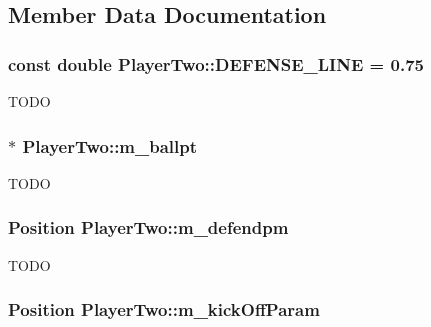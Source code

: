 \subsection{Member Data Documentation}
\hypertarget{classPlayerTwo_a86e1752bf84fab5d093f93633d3e51da}{
\subsubsection[{DEFENSE\_\-LINE}]{\setlength{\rightskip}{0pt plus 5cm}const double {\bf PlayerTwo::DEFENSE\_\-LINE} = 0.75}}
\label{classPlayerTwo_a86e1752bf84fab5d093f93633d3e51da}
TODO \hypertarget{classPlayerTwo_a14f2fe35deb15d4d45208273a51ec7eb}{
\subsubsection[{m\_\-ballpt}]{$\ast$ {\bf PlayerTwo::m\_\-ballpt}}}
\label{classPlayerTwo_a14f2fe35deb15d4d45208273a51ec7eb}
TODO \hypertarget{classPlayerTwo_aa6b42d687884c55d1dd30034e7952605}{
\subsubsection[{m\_\-defendpm}]{\setlength{\rightskip}{0pt plus 5cm}Position {\bf PlayerTwo::m\_\-defendpm}}}
\label{classPlayerTwo_aa6b42d687884c55d1dd30034e7952605}
TODO \hypertarget{classPlayerTwo_af294f3bef80e0df881b4452c1272376a}{
\subsubsection[{m\_\-kickOffParam}]{\setlength{\rightskip}{0pt plus 5cm}Position {\bf PlayerTwo::m\_\-kickOffParam}}}
